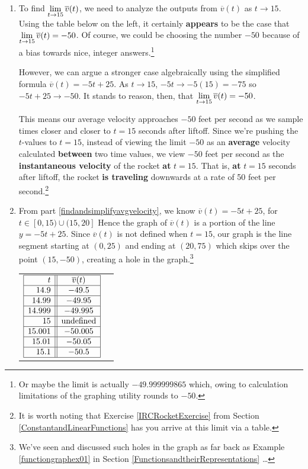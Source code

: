 \begin{ex}
\begin{enumerate}
\item  To find $\ds{ \lim_{t \rightarrow 15} \overline{v}(t)}$, we need to analyze the outputs from $\overline{v}(t)$ as $t \rightarrow 15$. Using the table below on the left, it certainly \textbf{appears} to be the case that $\ds{ \lim_{t \rightarrow 15} \overline{v}(t) = -50}$.  Of course, we could be choosing the number $-50$ because of a bias towards nice, integer answers.\footnote{Or maybe the limit is actually $-49.999999865$ which, owing to calculation limitations of the graphing utility rounds to $-50$.}

However, we can argue a stronger case algebraically using the simplified formula  $\overline{v}(t) = -5t+25$.   As $t \rightarrow15$,  $-5t \rightarrow -5(15) = -75$ so $-5t+25 \rightarrow -50$.  It stands to reason, then, that $\ds{ \lim_{t \rightarrow 15} \overline{v}(t) = -50}$.

This means our average velocity approaches $-50$ feet per second as we sample times closer and closer to $t = 15$ seconds after liftoff.  Since we're pushing the $t$-values to $t=15$, instead of viewing the limit $-50$ as an  \textbf{average} velocity calculated \textbf{between} two time values,  we view $-50$ feet per second as the  \textbf{instantaneous velocity} of the rocket \textbf{at} $t = 15$.   That is, \textbf{at} $t = 15$ seconds after liftoff, the rocket \textbf{is traveling} downwards at a rate of 50 feet per second.\footnote{It is worth noting that  Exercise \ref{IRCRocketExercise} from Section \ref{ConstantandLinearFunctions} has you arrive at this limit via a table.} 

\item    From part \ref{findandsimplifyavgvelocity}, we know $\overline{v}(t) = -5t+25$,  for $t \in [0, 15) \cup (15, 20]$  Hence the graph of  $\overline{v}(t)$ is a portion of the line $y=  -5t+25$.  Since $\overline{v}(t)$ is not defined when $t = 15$, our graph is the line segment starting at $(0, 25)$ and ending at $(20, 75)$ which skips over the point $(15, -50)$, creating a hole in the graph.\footnote{We've seen and discussed such holes in the graph as far back as Example \ref{functiongraphex01} in Section \ref{FunctionsandtheirRepresentations}  \ldots}   
\begin{center}

\begin{tabular}{m{2.5in}m{2.5in}}

$\begin{array}{|r||c|}  \hline
  t & \overline{v}(t)  \\ \hline
 14.9 & -49.5  \\  \hline
14.99 & -49.95  \\  \hline 
14.999 & -49.995  \\  \hline 
15 & \text{undefined} \\  \hline 
15.001 & -50.005 \\  \hline
15.01 & -50.05 \\  \hline  
15.1 & -50.5 \\  \hline 
  \end{array} $ 
  

\end{tabular}
\end{center}
\end{enumerate}
\end{ex}
